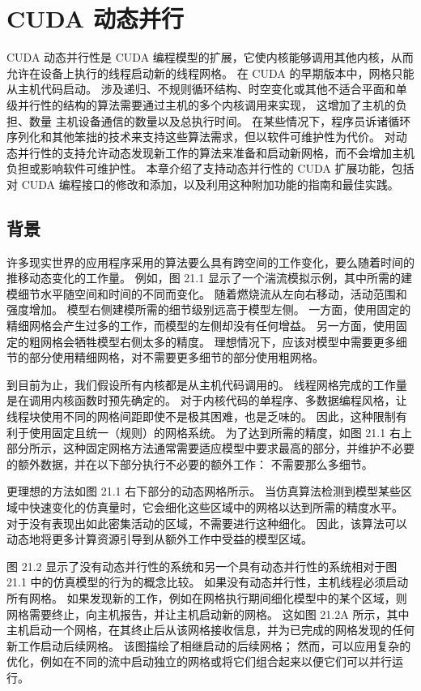 \section{CUDA 动态并行}
CUDA 动态并行性是 CUDA 编程模型的扩展，它使内核能够调用其他内核，从而允许在设备上执行的线程启动新的线程网格。 
在 CUDA 的早期版本中，网格只能从主机代码启动。 
涉及递归、不规则循环结构、时空变化或其他不适合平面和单级并行性的结构的算法需要通过主机的多个内核调用来实现，
这增加了主机的负担、数量 主机设备通信的数量以及总执行时间。 
在某些情况下，程序员诉诸循环序列化和其他笨拙的技术来支持这些算法需求，但以软件可维护性为代价。 
对动态并行性的支持允许动态发现新工作的算法来准备和启动新网格，而不会增加主机负担或影响软件可维护性。 
本章介绍了支持动态并行性的 CUDA 扩展功能，包括对 CUDA 编程接口的修改和添加，以及利用这种附加功能的指南和最佳实践。

\subsection{背景}
许多现实世界的应用程序采用的算法要么具有跨空间的工作变化，要么随着时间的推移动态变化的工作量。 例如，图 21.1 显示了一个湍流模拟示例，其中所需的建模细节水平随空间和时间的不同而变化。 随着燃烧流从左向右移动，活动范围和强度增加。 模型右侧建模所需的细节级别远高于模型左侧。 一方面，使用固定的精细网格会产生过多的工作，而模型的左侧却没有任何增益。 另一方面，使用固定的粗网格会牺牲模型右侧太多的精度。 理想情况下，应该对模型中需要更多细节的部分使用精细网格，对不需要更多细节的部分使用粗网格。

到目前为止，我们假设所有内核都是从主机代码调用的。 线程网格完成的工作量是在调用内核函数时预先确定的。 对于内核代码的单程序、多数据编程风格，让线程块使用不同的网格间距即使不是极其困难，也是乏味的。 因此，这种限制有利于使用固定且统一（规则）的网格系统。 为了达到所需的精度，如图 21.1 右上部分所示，这种固定网格方法通常需要适应模型中要求最高的部分，并维护不必要的额外数据，并在以下部分执行不必要的额外工作： 不需要那么多细节。

更理想的方法如图 21.1 右下部分的动态网格所示。 当仿真算法检测到模型某些区域中快速变化的仿真量时，它会细化这些区域中的网格以达到所需的精度水平。 对于没有表现出如此密集活动的区域，不需要进行这种细化。 因此，该算法可以动态地将更多计算资源引导到从额外工作中受益的模型区域。

图 21.2 显示了没有动态并行性的系统和另一个具有动态并行性的系统相对于图 21.1 中的仿真模型的行为的概念比较。 如果没有动态并行性，主机线程必须启动所有网格。 如果发现新的工作，例如在网格执行期间细化模型中的某个区域，则网格需要终止，向主机报告，并让主机启动新的网格。 这如图 21.2A 所示，其中主机启动一个网格，在其终止后从该网格接收信息，并为已完成的网格发现的任何新工作启动后续网格。 该图描绘了相继启动的后续网格； 然而，可以应用复杂的优化，例如在不同的流中启动独立的网格或将它们组合起来以便它们可以并行运行。

